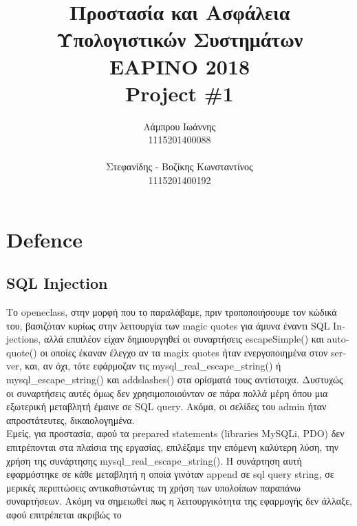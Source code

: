 \documentclass{article}
\begin{document}
\title{\vspace{-3.5cm}\textbf{Προστασία και Ασφάλεια Υπολογιστικών Συστημάτων \\ΕΑΡΙΝΟ 2018\\ \textlatin{Project \#}1}}
\author{Λάμπρου Ιωάννης \\1115201400088\\\\ Στεφανίδης - Βοζίκης Κωνσταντίνος \\1115201400192}

\maketitle
\section*{\textlatin{Defence}}
\subsection*{\textlatin{SQL Injection}}
Το \textlatin{openeclass}, στην μορφή που το παραλάβαμε, πριν τροποποιήσουμε τον κώδικά του, βασιζόταν κυρίως στην λειτουργία των \textlatin{magic quotes} για άμυνα έναντι \textlatin{SQL Injections}, αλλά επιπλέον είχαν δημιουργηθεί οι συναρτήσεις \textlatin{escapeSimple()} και \textlatin{autoquote()} οι οποίες έκαναν έλεγχο αν τα \textlatin{magix quotes} ήταν ενεργοποιημένα στον \textlatin{server}, και, αν όχι, τότε εφάρμοζαν τις \textlatin{mysql\_real\_escape\_string()} ή \textlatin{mysql\_escape\_string()} και \textlatin{addslashes()} στα ορίσματά τους αντίστοιχα. Δυστυχώς οι συναρτήσεις αυτές όμως δεν χρησιμοποιούνταν σε πάρα πολλά μέρη όπου μια εξωτερική μεταβλητή έμαινε σε \textlatin{SQL query}. Ακόμα, οι σελίδες του \textlatin{admin} ήταν απροστάτευτες, δικαιολογημένα.\\
Εμείς, για προστασία, αφού τα \textlatin{prepared statements (libraries MySQLi, PDO)} δεν επιτρέπονται στα πλαίσια της εργασίας, επιλέξαμε την επόμενη καλύτερη λύση, την χρήση της συνάρτησης \textlatin{mysql\_real\_escape\_string()}. Η συνάρτηση αυτή εφαρμόστηκε σε κάθε μεταβλητή η οποία γινόταν \textlatin{append} σε \textlatin{sql query string}, σε μερικές περιπτώσεις αντικαθιστώντας τη χρήση των υπολοίπων παραπάνω συναρτήσεων. Ακόμη να σημειωθεί πως η λειτουργικότητα της εφαρμογής δεν άλλαξε, αφού επιτρέπεται ακριβώς το  
\end{document}
